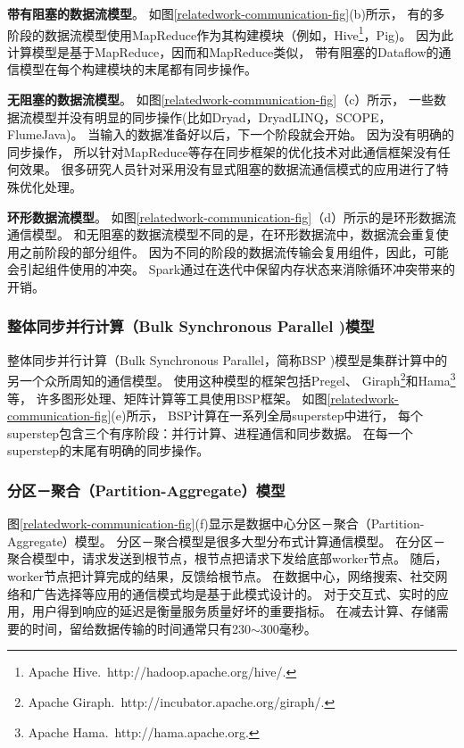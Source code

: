 \textbf{带有阻塞的数据流模型}。
如图\ref{relatedwork-communication-fig}(b)所示，
有的多阶段的数据流模型使用MapReduce作为其构建模块（例如，Hive\footnote{Apache Hive.~http://hadoop.apache.org/hive/.}，Pig\cite{Olston2008Pig})。
因为此计算模型是基于MapReduce，因而和MapReduce类似，
带有阻塞的Dataflow的通信模型在每个构建模块的末尾都有同步操作。

\textbf{无阻塞的数据流模型}。
如图\ref{relatedwork-communication-fig}（c）所示，
一些数据流模型并没有明显的同步操作(比如Dryad\cite{Isard2007Dryad}，DryadLINQ\cite{Yu2008DryadLINQ}，SCOPE\cite{Chaiken2008SCOPE}，FlumeJava\cite{Chambers2010FlumeJava})。
当输入的数据准备好以后，下一个阶段就会开始。
因为没有明确的同步操作，
所以针对MapReduce等存在同步框架的优化技术对此通信框架没有任何效果。
很多研究人员针对采用没有显式阻塞的数据流通信模式的应用进行了特殊优化处理\cite{Guo2015Spotting,Zhang2012Optimizing}。

\textbf{环形数据流模型}。
如图\ref{relatedwork-communication-fig}（d）所示的是环形数据流通信模型。
和无阻塞的数据流模型不同的是，在环形数据流中，数据流会重复使用之前阶段的部分组件。
因为不同的阶段的数据流传输会复用组件，因此，可能会引起组件使用的冲突。
Spark\cite{Zaharia2012Resilient}通过在迭代中保留内存状态来消除循环冲突带来的开销。

\subsubsection{整体同步并行计算（Bulk Synchronous Parallel )模型}
整体同步并行计算（Bulk Synchronous Parallel，简称BSP )模型是集群计算中的另一个众所周知的通信模型。
使用这种模型的框架包括Pregel\cite{Malewicz2010Pregel}、
Giraph\footnote{Apache Giraph.~http://incubator.apache.org/giraph/.}和Hama\footnote{Apache Hama.~http://hama.apache.org.}等，
许多图形处理、矩阵计算等工具使用BSP框架。
如图\ref{relatedwork-communication-fig}(e)所示，
BSP计算在一系列全局superstep中进行，
每个superstep包含三个有序阶段：并行计算、进程通信和同步数据。
在每一个superstep的末尾有明确的同步操作。

\subsubsection{分区－聚合（Partition-Aggregate）模型}
图\ref{relatedwork-communication-fig}(f)显示是数据中心分区－聚合（Partition-Aggregate）模型。
分区－聚合模型是很多大型分布式计算通信模型。
在分区－聚合模型中，请求发送到根节点，根节点把请求下发给底部worker节点。
随后，worker节点把计算完成的结果，反馈给根节点。
在数据中心，网络搜索、社交网络和广告选择等应用的通信模式均是基于此模式设计的。
对于交互式、实时的应用，用户得到响应的延迟是衡量服务质量好坏的重要指标。
在减去计算、存储需要的时间，留给数据传输的时间通常只有230$\sim$300毫秒。


